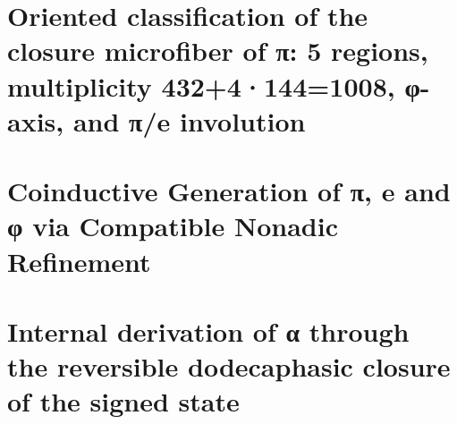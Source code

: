 


\chapter{Oriented classification of the closure microfiber of π: 5 regions, multiplicity 432+4·144=1008, φ-axis, and π/e involution}
\label{chap:sucesor-102-09}


\chapter{Coinductive Generation of π, e and φ via Compatible Nonadic Refinement}
\label{chap:sucesor-102-10}




















\chapter{Internal derivation of α through the reversible dodecaphasic closure of the signed state}
\label{chap:sucesor-102-11}



















